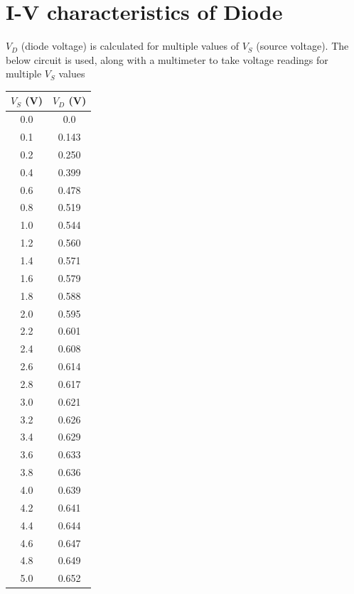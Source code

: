 \documentclass[12pt,a4paper]{article}
\begin{document}
\section{I-V characteristics of Diode}
$V_D$ (diode voltage) is calculated for multiple values of $V_S$ (source voltage). The below circuit is used, along with a multimeter to take voltage readings for multiple $V_S$ values
\begin{figure}[!ht]
\centering
{}%
\end{figure}
\pagebreak
\begin{table}[h!]
\centering
\begin{tabular}{|c|c|}
\hline
$V_S$ (V) & $V_D$ (V) \\
\hline
0.0 & 0.0 \\
0.1 & 0.143 \\
0.2 & 0.250 \\
0.4 & 0.399 \\
0.6 & 0.478 \\
0.8 & 0.519 \\
1.0 & 0.544 \\
1.2 & 0.560 \\
1.4 & 0.571 \\
1.6 & 0.579 \\
1.8 & 0.588 \\
2.0 & 0.595 \\
2.2 & 0.601 \\
2.4 & 0.608 \\
2.6 & 0.614 \\
2.8 & 0.617 \\
3.0 & 0.621 \\
3.2 & 0.626 \\
3.4 & 0.629 \\
3.6 & 0.633 \\
3.8 & 0.636 \\
4.0 & 0.639 \\
4.2 & 0.641 \\
4.4 & 0.644 \\
4.6 & 0.647 \\
4.8 & 0.649 \\
5.0 & 0.652 \\
\hline
\end{tabular}
\end{table}
\end{document}
